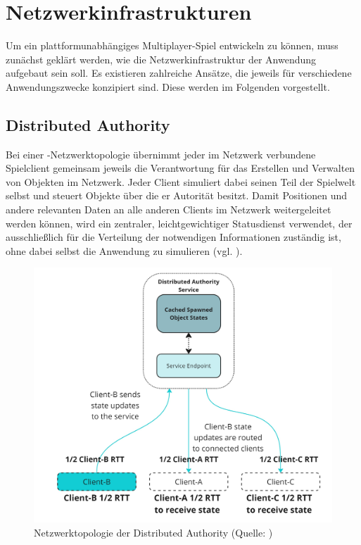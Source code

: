 \section{Netzwerkinfrastrukturen}\label{sec:basics-network-structures}
Um ein plattformunabhängiges Multiplayer-Spiel entwickeln zu können, muss zunächst geklärt werden, wie die Netzwerkinfrastruktur der Anwendung aufgebaut sein soll. Es existieren zahlreiche Ansätze, die jeweils für verschiedene Anwendungszwecke konzipiert sind. Diese werden im Folgenden vorgestellt.

\subsection{Distributed Authority}
Bei einer -Netzwerktopologie übernimmt jeder im Netzwerk verbundene Spielclient gemeinsam jeweils die Verantwortung für das Erstellen und Verwalten von Objekten im Netzwerk. Jeder Client simuliert dabei seinen Teil der Spielwelt selbst und steuert Objekte über die er Autorität besitzt.
Damit Positionen und andere relevanten Daten an alle anderen Clients im Netzwerk weitergeleitet werden können, wird ein zentraler, leichtgewichtiger Statusdienst verwendet, der ausschließlich für die Verteilung der notwendigen Informationen zuständig ist, ohne dabei selbst die Anwendung zu simulieren (vgl. \citealp{reeve_distributed_2025}).

\begin{figure}[ht]
\centering
\includegraphics[width=1\linewidth]{content/pictures/distributed-authority-service.jpg}
\caption{Netzwerktopologie der Distributed Authority (Quelle: \citealp{reeve_distributed_2025})}
\label{fig:distributed_authority_topology}
\end{figure}

